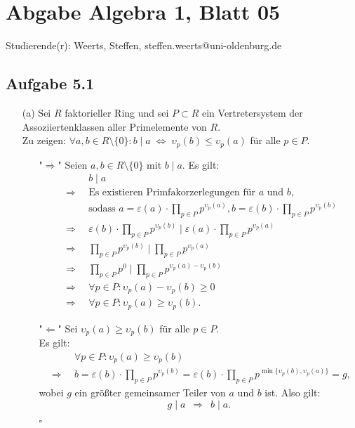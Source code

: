 \documentclass[12pt]{article}
\newcommand{\QED}{\begin{flushright} $\square$ \end{flushright}}
\newcommand{\df}{\enspace\Longrightarrow\enspace}
\newcommand{\gdw}{\;\Longleftrightarrow\;}
\begin{document}
\section*{Abgabe Algebra 1, Blatt 05}

Studierende(r): Weerts, Steffen, steffen.weerts@uni-oldenburg.de

\subsection*{Aufgabe 5.1}
\begin{enumerate}
	\item[(a)] Sei $R$ faktorieller Ring und sei $P\subset R$ ein Vertretersystem der Assoziiertenklassen aller Primelemente von $R$. \\
	Zu zeigen: $\forall a,b\in R\setminus\{0\}:b\mid a \gdw \upsilon_p(b)\leq\upsilon_p(a)$ für alle $p\in P$. \\
	\begin{enumerate}
		\item["$\Longrightarrow$"] Seien $a,b\in R\setminus\{0\}$ mit $b\mid a$. Es gilt:
		\begin{align*}
			&b\mid a \\
			\df &\text{Es existieren Primfakorzerlegungen für $a$ und $b$,} \\
			&\text{sodass }a=\varepsilon(a)\cdot\prod_{p\in P}p^{\upsilon_p(a)},b=\varepsilon(b)\cdot\prod_{p\in P}p^{\upsilon_p(b)} \\
			\df &\varepsilon(b)\cdot\prod_{p\in P}p^{\upsilon_p(b)} \mid \varepsilon(a)\cdot\prod_{p\in P}p^{\upsilon_p(a)} \\
			\df &\prod_{p\in P}p^{\upsilon_p(b)} \mid \prod_{p\in P}p^{\upsilon_p(a)} \\
			\df &\prod_{p\in P}p^{0} \mid \prod_{p\in P}p^{\upsilon_p(a)-\upsilon_p(b)} \\
			\df &\forall p\in P:\upsilon_p(a)-\upsilon_p(b)\geq 0 \\
			\df &\forall p\in P:\upsilon_p(a)\geq\upsilon_p(b).
		\end{align*}
		
		\item["$\Longleftarrow$"] Sei $\upsilon_p(a)\geq\upsilon_p(b)$ für alle $p\in P$. \\
		Es gilt:
		\begin{align*}
			&\forall p\in P:\upsilon_p(a)\geq\upsilon_p(b) \\
			\df &b=\varepsilon(b)\cdot\prod_{p\in P}p^{\upsilon_p(b)}=\varepsilon(b)\cdot\prod_{p\in P}p^{\min\{\upsilon_p(b),\upsilon_p(a)\}}=g,
		\end{align*}
		wobei $g$ ein größter gemeinsamer Teiler von $a$ und $b$ ist.
		Also gilt: $$g\mid a \df b\mid a.$$
		\QED
	\end{enumerate}
	

\end{enumerate}
\end{document}
